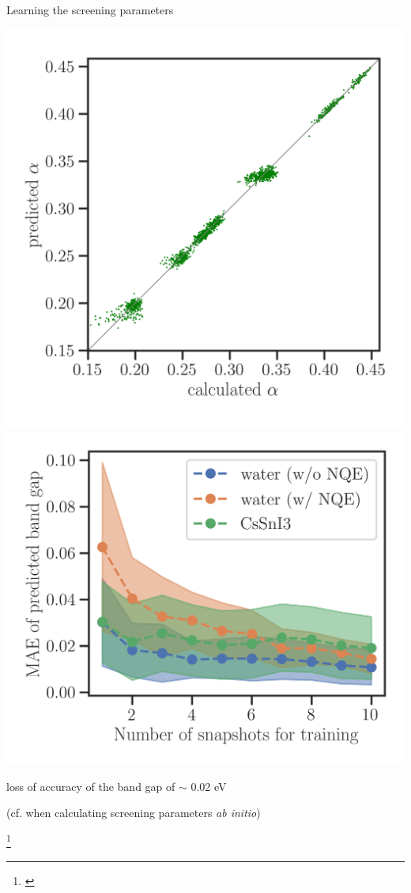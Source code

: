 \documentclass[xcolor=table,aspectratio=169]{beamer}
\newcommand\blfootcite[1]{%
  \begingroup
  \renewcommand\thefootnote{}\footnote{\hspace{-4ex}\cite{#1}}%
  \addtocounter{footnote}{-1}%
  \endgroup
}
\numberwithin{equation}{section}
\begin{document}
\begin{frame}{Learning the screening parameters}
   \begin{center}

      \includegraphics[height=0.7\paperheight]{figures/CsSnI3_calc_vs_pred_Edward.png}
      \includegraphics[height=0.7\paperheight]{figures/convergence_analysis_Edward.png}

      loss of accuracy of the band gap of $\sim$ 0.02 eV

      (cf. when calculating screening parameters \emph{ab initio})
   \end{center}

   \blfootcite{Schubert2022}

\end{frame}
\end{document}
